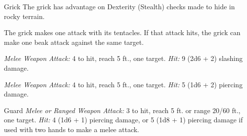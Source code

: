 \documentclass[10pt,a4paper,twoside,bg=print,twocolumn,openany,nodeprecatedcode]{dndbook}
\begin{document}
\begin{DndMonster}[float=t]{Grick}
\DndMonsterBasics[
armor-class = {14 (natural armor)},
hit-points = {\DndDice{6d8}},
speed = {30 ft., climb 30 ft.}
]
\DndMonsterAbilityScores[
 str = 14,
 dex = 14,
 con = 11,
 int = 3,
 wis = 14,
 cha = 5
]
\DndMonsterDetails[
damage-resistances = {bludgeoning, piercing, slashing from nonmagical attacks},
senses = {darkvision 60 ft., passive perception 12},
challenge = 2,
]
The grick has advantage on Dexterity (Stealth) checks made to hide in rocky terrain.

The grick makes one attack with its tentacles. If that attack hits, the grick can make one beak attack against the same target.

\textsl{Melee Weapon Attack:} 4 to hit, reach 5 ft., one target. \textsl{Hit:} 9 (2d6 + 2) slashing damage.

\textsl{Melee Weapon Attack:} 4 to hit, reach 5 ft., one target. \textsl{Hit:} 5 (1d6 + 2) piercing damage.

\end{DndMonster}



\begin{DndMonster}[float=t]{Guard}
\DndMonsterBasics[
armor-class = {16 (\textit{chain shirt})},
hit-points = {\DndDice{2d8 + 2}},
speed = {30 ft.}
]
\DndMonsterAbilityScores[
 str = 13,
 dex = 12,
 con = 12,
 int = 10,
 wis = 11,
 cha = 10
]
\DndMonsterDetails[
skills = {Perception +2},
languages = {any one language (usually Common)},
challenge = 1/8,
]
\textsl{Melee or Ranged Weapon Attack:} 3 to hit, reach 5 ft. or range 20/60 ft., one target. \textsl{Hit:} 4 (1d6 + 1) piercing damage, or 5 (1d8 + 1) piercing damage if used with two hands to make a melee attack.

\end{DndMonster}
\end{document}

